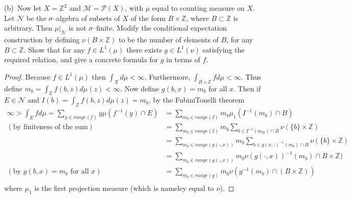 \documentclass[11pt]{amsart}
\theoremstyle{definition}
\numberwithin{theorem}{section}
\numberwithin{definition}{section}
\numberwithin{equation}{section}
\def\integers{{\mathbb Z}}
\def\scriptm{{\mathcal M}}
\def\scriptn{{\mathcal N}}
\def\scriptp{{\mathcal P}}
\begin{document}
(b)\ Now let $X=\integers^2$ and $\scriptm=\scriptp(X)$,
with $\mu$ equal to counting measure on $X$.
Let $\scriptn$ be the $\sigma$--algebra of subsets of $X$
of the form $B\times\integers$, where $B\subset\integers$
is arbitrary. Then $\mu|_\scriptn$ is not $\sigma$--finite.
Modify the conditional expectation construction by defining
$\nu(B\times\integers)$ to be the number of elements of $B$,
for any $B\subset\integers$. Show that for any $f\in L^1(\mu)$
there exists $g\in L^1(\nu)$ satisfying the required relation, 
and give a concrete formula for $g$ in terms of $f$.
\begin{proof}
	Because $f \in L^1(\mu)$ then $\int_X d\mu < \infty.$ Furthermore, $\int_{B\times\mathbb{Z}} f d\mu < \infty$.
	Thus define $m_b = \int_{\mathbb{Z}} f(b, z) d\mu(z) < \infty$. Now define $g(b,x) = m_b$ for all $x$.
	Then if $E \in \scriptn$ and $I(b) = \int_{\mathbb{Z}} f(b,z) d\mu(z) = m_b$, by the FubiniTonelli theorem
	\begin{equation*}
	\begin{aligned}
		\infty > \int_E f d\mu = \sum_{y \in range(f)} y \mu(f^{-1}(y) \cap E) &= \sum_{m_b \in range(I)}  m_b \mu_1(I^{-1}(m_b) \cap B) \\
		(\text{by finiteness of the sum})\;\;&= \sum_{m_b \in range(I)}m_b \sum_{b \in I^{-1}(m_B) \cap B}   \nu(\{b\} \times \mathbb{Z}) \\
		&= \sum_{m_b \in range(g(\cdot, x))}m_b \sum_{b \in g(x,\cdot)^{-1}(m_b) \cap B}   \nu(\{b\} \times \mathbb{Z}) \\
		&= \sum_{m_b \in range(g(\cdot, x))} m_b  \nu(g(\cdot, x))^{-1}(m_b) \cap B \times \mathbb{Z})  \\
		(\text{by }g(b,x) = m_b\text{ for all }x)\;\; &= \sum_{m_b \in range(g)} m_b  \nu(g^{-1}(m_b) \cap (B \times \mathbb{Z}))  \\
	\end{aligned}
	\end{equation*}
	where $\mu_1$ is the first projection measure (which is nameley equal to $\nu$).
\end{proof}
\end{document}
